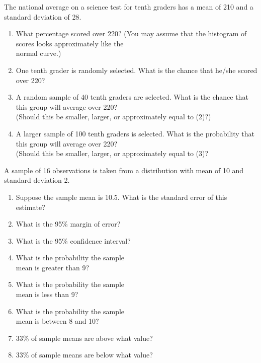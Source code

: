 \documentclass[11pt, chapterprefix=true]{scrbook}\usepackage[]{graphicx}\usepackage[]{color}
\begin{document}
\begin{exercises}
\begin{exercise}  %

The national average on a science test for tenth graders has a mean of 210 and a standard deviation of 28.

\begin{enumerate}
  \item What percentage scored over 220?  (You may assume that the histogram of \\ scores looks approximately like the \\ normal  curve.)
  \item One tenth grader is randomly selected.  What is the chance that he/she scored over 220?
  \item A random sample of 40 tenth graders are selected.  What is the chance that this group will average over 220? \\ (Should this be smaller, larger, or approximately equal to (2)?)
  \item A larger sample of 100 tenth graders is selected.  What is the probability that this group will average over 220?  \\ (Should this be smaller, larger, or approximately equal to (3)?
\end{enumerate}

\end{exercise}
\begin{solution}  %

\end{solution}

\begin{exercise}  %

A sample of 16 observations is taken from a distribution with mean of 10 and standard deviation 2.

\begin{enumerate}
  \item Suppose the sample mean is 10.5. What is the standard error of this estimate?
  \item What is the 95\% margin of error?
  \item What is the 95\% confidence interval?
  \item What is the probability the sample \\ mean is greater than 9?
  \item What is the probability the sample \\ mean is less than 9? 
  \item What is the probability the sample \\ mean is between 8 and 10? 
  \item 33\% of sample means are above what value? 
  \item 33\% of sample means are below what value?
\end{enumerate}
\end{exercise}
\begin{solution}  %


\end{solution}
\end{exercises}
\end{document}
